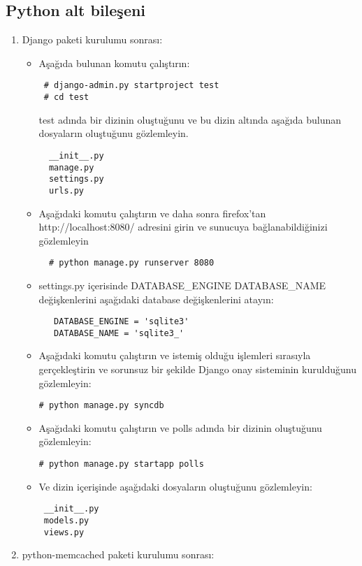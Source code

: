\documentclass[a4paper,10pt]{article}
\begin{document}
\subsection{Python alt bileşeni}
\begin{enumerate}
 \item Django paketi kurulumu sonrası:
\begin{itemize}
 \item Aşağıda bulunan komutu çalıştırın:
 \begin{verbatim}
 # django-admin.py startproject test
 # cd test
 \end{verbatim}
 test adında bir dizinin oluştuğunu ve bu dizin altında aşağıda bulunan dosyaların oluştuğunu gözlemleyin.
  \begin{verbatim}
  __init__.py
  manage.py
  settings.py
  urls.py 
  \end{verbatim}
 \item Aşağıdaki komutu çalıştırın ve daha sonra firefox'tan http://localhost:8080/ adresini girin ve sunucuya bağlanabildiğinizi gözlemleyin
  \begin{verbatim}
  # python manage.py runserver 8080
  \end{verbatim}
 \item settings.py içerisinde DATABASE\_ENGINE DATABASE\_NAME değişkenlerini aşağıdaki database değişkenlerini atayın:
  \begin{verbatim}
   DATABASE_ENGINE = 'sqlite3'
   DATABASE_NAME = 'sqlite3_'   
  \end{verbatim}
\item Aşağıdaki komutu çalıştırın ve istemiş olduğu işlemleri sırasıyla gerçekleştirin ve sorunsuz bir şekilde Django onay sisteminin kurulduğunu gözlemleyin:
\begin{verbatim}
# python manage.py syncdb 
\end{verbatim}
\item Aşağıdaki komutu çalıştırın ve polls adında bir dizinin oluştuğunu gözlemleyin:
\begin{verbatim}
# python manage.py startapp polls 
\end{verbatim}
\item Ve dizin içerişinde aşağıdaki dosyaların oluştuğunu gözlemleyin:
\begin{verbatim}
 __init__.py
 models.py
 views.py
\end{verbatim}

\end{itemize}

\item python-memcached paketi kurulumu sonrası:


\end{enumerate}
\end{document}
